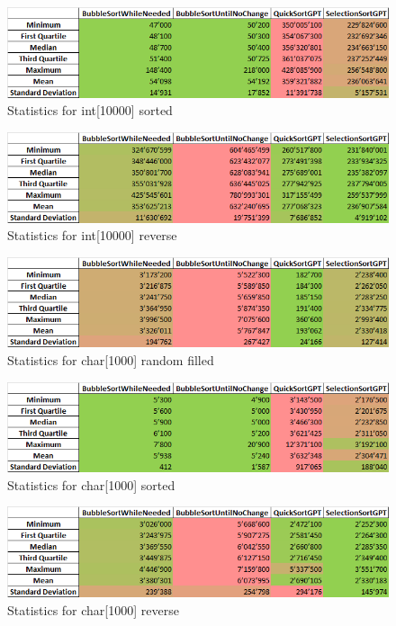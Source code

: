 \documentclass{article}
\begin{document}
\begin{figure}[!h]
    \centering
    \includegraphics[width=0.75\linewidth]{int10000sort-stat.png}
    \caption{Statistics for int[10000] sorted}
    \label{fig:int10000sort-stat}
\end{figure}
\begin{figure}[!h]
    \centering
    \includegraphics[width=0.75\linewidth]{int10000rev-stat.png}
    \caption{Statistics for int[10000] reverse}
    \label{fig:int10000rev-stat}
\end{figure}
\begin{figure}[!h]
    \centering
    \includegraphics[width=0.75\linewidth]{char1000rand-stat.png}
    \caption{Statistics for char[1000] random filled}
    \label{fig:char1000rand-stat}
\end{figure}
\begin{figure}[!h]
    \centering
    \includegraphics[width=0.75\linewidth]{char1000sort-stat.png}
    \caption{Statistics for char[1000] sorted}
    \label{fig:char1000sort-stat}
\end{figure}
\begin{figure}[!h]
    \centering
    \includegraphics[width=0.75\linewidth]{char1000rev-stat.png}
    \caption{Statistics for char[1000] reverse}
    \label{fig:char1000rev-stat}
\end{figure}
\end{document}
